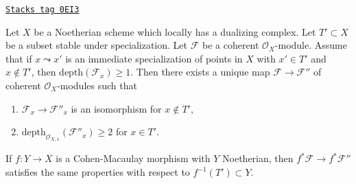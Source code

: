 \begin{lemma}
\label{local-cohomology-lemma-make-S2-along-T-simple}
\href{https://stacks.math.columbia.edu/tag/0EI3}{\texttt{Stacks tag 0EI3}}

Let $X$ be a Noetherian scheme which locally has a dualizing complex.
Let $T' \subset X$ be a subset stable under specialization.
Let $\mathcal{F}$ be a coherent $\mathcal{O}_X$-module.
Assume that if $x \leadsto x'$ is an immediate specialization
of points in $X$ with $x' \in T'$ and $x \not \in T'$, then
$\text{depth}(\mathcal{F}_x) \geq 1$.
Then there exists a unique map $\mathcal{F} \to \mathcal{F}''$
of coherent $\mathcal{O}_X$-modules such that
\begin{enumerate}
\item $\mathcal{F}_x \to \mathcal{F}''_x$ is an isomorphism
for $x \not \in T'$,
\item $\text{depth}_{\mathcal{O}_{X, x}}(\mathcal{F}''_x) \geq 2$
for $x \in T'$.
\end{enumerate}
If $f : Y \to X$ is a Cohen-Macaulay morphism with $Y$ Noetherian,
then $f^*\mathcal{F} \to f^*\mathcal{F}''$ satisfies the same properties
with respect to $f^{-1}(T') \subset Y$.
\end{lemma}

